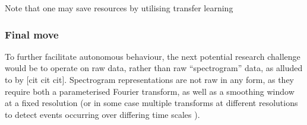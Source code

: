 \documentclass[12pt]{llncs}
\begin{document}
Note that one may save resources by utilising transfer learning \cite[Paper uses a Caffe ILSVRC CNN as baseline]{gwardys2014deep}








	




\subsubsection{Final move}

To further facilitate autonomous behaviour, the next potential research challenge would be to operate on raw data, rather than raw ``spectrogram'' data, as alluded to by [cit cit cit]. Spectrogram representations are not raw in any form, as they require both a parameterised Fourier transform, as well as a smoothing window at a fixed resolution (or in some case multiple transforms at different resolutions to detect events occurring over differing time scales \cite{espi2015exploiting}).
\end{document}
